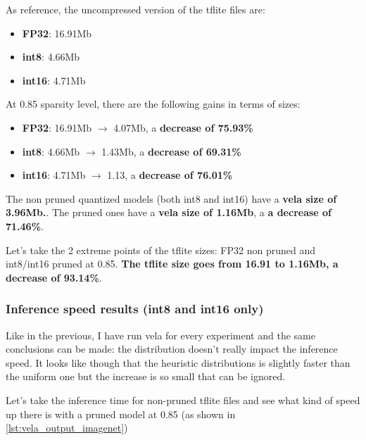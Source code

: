 As reference, the uncompressed version of the tflite files are:
\begin{itemize}
    \item \textbf{FP32}: 16.91Mb
    \item \textbf{int8}: 4.66Mb
    \item \textbf{int16}: 4.71Mb
\end{itemize}

At 0.85 sparsity level, there are the following gains in terms of sizes:
\begin{itemize}
    \item \textbf{FP32}: 16.91Mb $\rightarrow$ 4.07Mb, a \textbf{decrease of 75.93\%}
    \item \textbf{int8}: 4.66Mb $\rightarrow$ 1.43Mb, a \textbf{decrease of 69.31\%}
    \item \textbf{int16}: 4.71Mb $\rightarrow$ 1.13, a \textbf{decrease of 76.01\%}
\end{itemize}

The non pruned quantized models (both int8 and int16) have a \textbf{vela size
of 3.96Mb.}. The pruned ones have a \textbf{vela size of 1.16Mb}, a \textbf{a
decrease of 71.46\%}.

Let's take the 2 extreme points of the tflite sizes: FP32 non pruned and
int8/int16 pruned at 0.85. \textbf{The tflite size goes from 16.91 to 1.16Mb,
a decrease of 93.14\%}.

\subsubsection{Inference speed results (int8 and int16 only)}
Like in the previous, I have run vela for every experiment and the same
conclusions can be made: the distribution doesn't really impact the inference
speed.
It looks like though that the heuristic distributions is slightly faster than
the uniform one but the increase is so small that can be ignored.

Let's take the inference time for non-pruned tflite files and see what kind of
speed up there is with a pruned model at 0.85 (as shown in
\autoref{lst:vela_output_imagenet})

